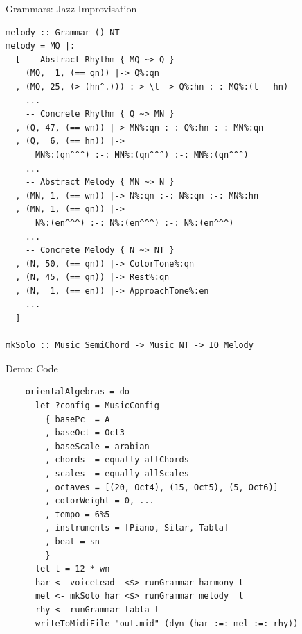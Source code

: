 \documentclass{beamer}
\begin{document}
	\begin{frame}[fragile=singleslide]{Grammars: Jazz Improvisation}
	\begin{verbatim}
melody :: Grammar () NT
melody = MQ |:
  [ -- Abstract Rhythm { MQ ~> Q }
    (MQ,  1, (== qn)) |-> Q%:qn
  , (MQ, 25, (> (hn^.))) :-> \t -> Q%:hn :-: MQ%:(t - hn)
    ...
    -- Concrete Rhythm { Q ~> MN }
  , (Q, 47, (== wn)) |-> MN%:qn :-: Q%:hn :-: MN%:qn
  , (Q,  6, (== hn)) |->
      MN%:(qn^^^) :-: MN%:(qn^^^) :-: MN%:(qn^^^)
    ...
    -- Abstract Melody { MN ~> N }
  , (MN, 1, (== wn)) |-> N%:qn :-: N%:qn :-: MN%:hn
  , (MN, 1, (== qn)) |->
      N%:(en^^^) :-: N%:(en^^^) :-: N%:(en^^^)
    ...
    -- Concrete Melody { N ~> NT }
  , (N, 50, (== qn)) |-> ColorTone%:qn
  , (N, 45, (== qn)) |-> Rest%:qn
  , (N,  1, (== en)) |-> ApproachTone%:en
    ...
  ]

mkSolo :: Music SemiChord -> Music NT -> IO Melody
    \end{verbatim}
	\end{frame}
	
	\begin{frame}[fragile=singleslide]{Demo: Code}
	\begin{verbatim}
    orientalAlgebras = do
      let ?config = MusicConfig
        { basePc  = A
        , baseOct = Oct3
        , baseScale = arabian
        , chords  = equally allChords
        , scales  = equally allScales
        , octaves = [(20, Oct4), (15, Oct5), (5, Oct6)]
        , colorWeight = 0, ...
        , tempo = 6%5
        , instruments = [Piano, Sitar, Tabla]
        , beat = sn
        }
      let t = 12 * wn
      har <- voiceLead  <$> runGrammar harmony t
      mel <- mkSolo har <$> runGrammar melody  t
      rhy <- runGrammar tabla t
      writeToMidiFile "out.mid" (dyn (har :=: mel :=: rhy))
	\end{verbatim}
  	\end{frame}
	
\end{document}
